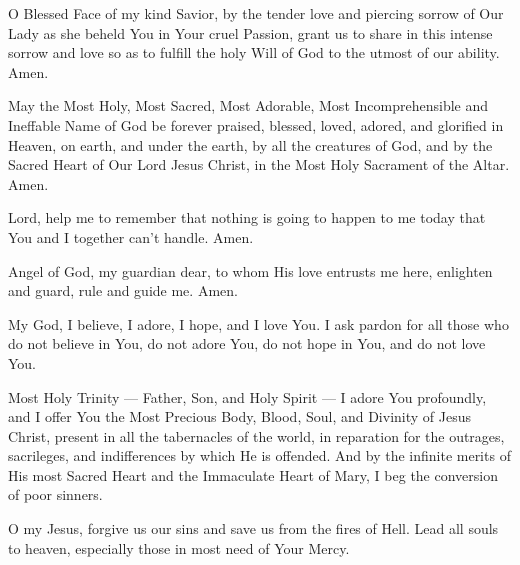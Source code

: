 \label{prayer:holy_face}
O Blessed Face of my kind Savior, by the tender love and piercing sorrow of Our Lady as she beheld You in Your cruel Passion, grant us to share in this intense sorrow and love
so as to fulfill the holy Will of God to the utmost of our ability.
Amen.

May the Most Holy, Most Sacred, Most Adorable, Most Incomprehensible and Ineffable Name of God
be forever praised, blessed, loved, adored, and glorified in Heaven, on earth, and under the earth, by all the creatures of God, and by the Sacred Heart of Our Lord Jesus Christ, in the Most Holy Sacrament of the Altar.
Amen.

\label{prayer:short}
Lord, help me to remember that nothing is going to happen to me today that You and I together can't handle. Amen.

Angel of God, my guardian dear, to whom His love entrusts me here, enlighten and guard, rule and guide me. Amen.

My God, I believe, I adore, I hope, and I love You. I ask pardon for all those who do not believe in You, do not adore You, do not hope in You, and do not love You.

Most Holy Trinity --- Father, Son, and Holy Spirit --- I adore You profoundly, and I offer You the Most Precious Body, Blood, Soul, and Divinity of Jesus Christ, present in all the tabernacles of the world, in reparation for the outrages, sacrileges, and indifferences by which He is offended.
And by the infinite merits of His most Sacred Heart and the Immaculate Heart of Mary, I beg the conversion of poor sinners.

O my Jesus, forgive us our sins and save us from the fires of Hell.
Lead all souls to heaven, especially those in most need of Your Mercy.

